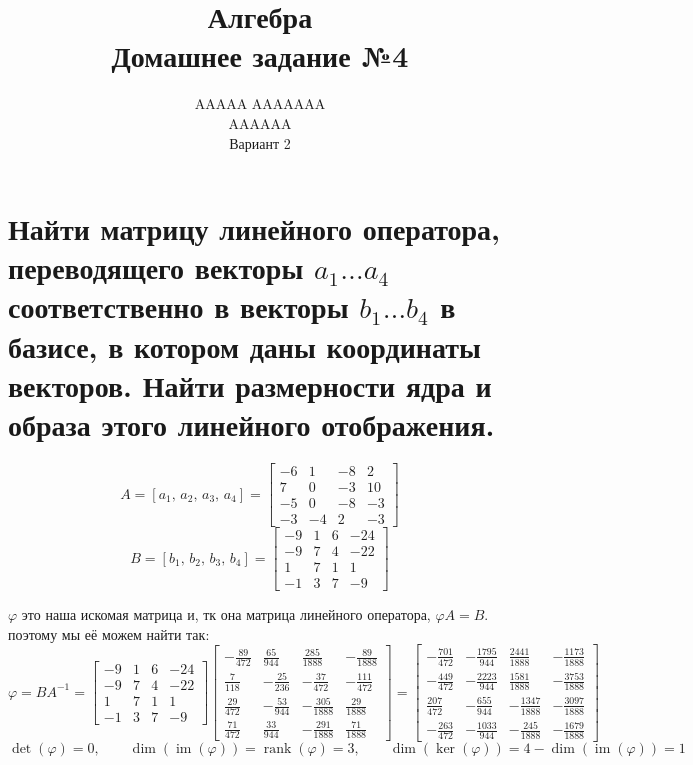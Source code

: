 \documentclass{article}
\title{Алгебра \\ Домашнее задание №4}
\author{AAAAA AAAAAAA \\ AAAAAA \\ Вариант 2}
\renewcommand{\f}{\frac}
\renewcommand{\l}{\left}
\renewcommand{\r}{\right}
\renewcommand{\phi}{\varphi}
\DeclareMathOperator{\rank}{rank}
\DeclareMathOperator{\im}{im}
\begin{document}
  \maketitle

  \section{Найти матрицу линейного оператора, переводящего векторы $a_1 \dots a_4$ соответственно в векторы $b_1 \dots b_4$ в базисе, в котором даны координаты векторов. Найти размерности ядра и образа этого линейного отображения.}
  $$A = \l[a_1,\, a_2,\, a_3,\, a_4\r] = \begin{bmatrix}-6&1&-8&2\\7&0&-3&10\\-5&0&-8&-3\\-3&-4&2&-3\end{bmatrix}$$
  $$B = \l[b_1,\, b_2,\, b_3,\, b_4\r] = \begin{bmatrix}-9&1&6&-24\\-9&7&4&-22\\1&7&1&1\\-1&3&7&-9\end{bmatrix}$$

  \noindent
  $\phi$ это наша искомая матрица и, тк она матрица линейного оператора, $\phi A = B$.
  поэтому мы её можем найти так:
  $$\phi = BA^{-1} = \begin{bmatrix}-9&1&6&-24\\-9&7&4&-22\\1&7&1&1\\-1&3&7&-9\end{bmatrix} \begin{bmatrix}- \f{89}{472} & \f{65}{944} & \frac{285}{1888} & - \f{89}{1888}\\\f{7}{118} & - \f{25}{236} & - \f{37}{472} & - \f{111}{472}\\\f{29}{472} & - \f{53}{944} & - \f{305}{1888} & \f{29}{1888}\\\f{71}{472} & \f{33}{944} & - \f{291}{1888} & \f{71}{1888}\end{bmatrix} = \begin{bmatrix}- \f{701}{472} & - \f{1795}{944} & \f{2441}{1888} & - \f{1173}{1888}\\- \f{449}{472} & - \f{2223}{944} & \f{1581}{1888} & - \f{3753}{1888}\\\f{207}{472} & - \f{655}{944} & - \f{1347}{1888} & - \f{3097}{1888}\\- \f{263}{472} & - \f{1033}{944} & - \f{245}{1888} & - \f{1679}{1888}\end{bmatrix}$$
  $$\det(\phi) = 0, \qquad \dim(\im(\phi))=\rank(\phi) = 3, \qquad \dim(\ker(\phi))=4-\dim(\im(\phi))=1$$
\end{document}

